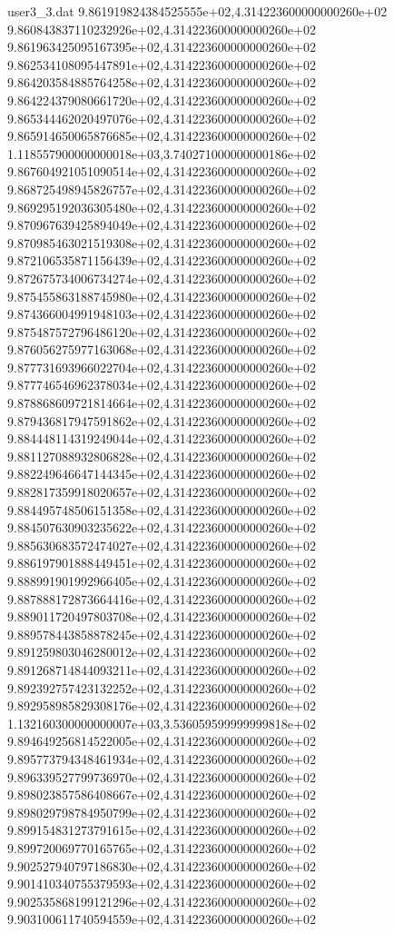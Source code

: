 \begin{filecontents}{user3_3.dat}
9.861919824384525555e+02,4.314223600000000260e+02
9.860843837110232926e+02,4.314223600000000260e+02
9.861963425095167395e+02,4.314223600000000260e+02
9.862534108095447891e+02,4.314223600000000260e+02
9.864203584885764258e+02,4.314223600000000260e+02
9.864224379080661720e+02,4.314223600000000260e+02
9.865344462020497076e+02,4.314223600000000260e+02
9.865914650065876685e+02,4.314223600000000260e+02
1.118557900000000018e+03,3.740271000000000186e+02
9.867604921051090514e+02,4.314223600000000260e+02
9.868725498945826757e+02,4.314223600000000260e+02
9.869295192036305480e+02,4.314223600000000260e+02
9.870967639425894049e+02,4.314223600000000260e+02
9.870985463021519308e+02,4.314223600000000260e+02
9.872106535871156439e+02,4.314223600000000260e+02
9.872675734006734274e+02,4.314223600000000260e+02
9.875455863188745980e+02,4.314223600000000260e+02
9.874366004991948103e+02,4.314223600000000260e+02
9.875487572796486120e+02,4.314223600000000260e+02
9.876056275977163068e+02,4.314223600000000260e+02
9.877731693966022704e+02,4.314223600000000260e+02
9.877746546962378034e+02,4.314223600000000260e+02
9.878868609721814664e+02,4.314223600000000260e+02
9.879436817947591862e+02,4.314223600000000260e+02
9.884448114319249044e+02,4.314223600000000260e+02
9.881127088932806828e+02,4.314223600000000260e+02
9.882249646647144345e+02,4.314223600000000260e+02
9.882817359918020657e+02,4.314223600000000260e+02
9.884495748506151358e+02,4.314223600000000260e+02
9.884507630903235622e+02,4.314223600000000260e+02
9.885630683572474027e+02,4.314223600000000260e+02
9.886197901888449451e+02,4.314223600000000260e+02
9.888991901992966405e+02,4.314223600000000260e+02
9.887888172873664416e+02,4.314223600000000260e+02
9.889011720497803708e+02,4.314223600000000260e+02
9.889578443858878245e+02,4.314223600000000260e+02
9.891259803046280012e+02,4.314223600000000260e+02
9.891268714844093211e+02,4.314223600000000260e+02
9.892392757423132252e+02,4.314223600000000260e+02
9.892958985829308176e+02,4.314223600000000260e+02
1.132160300000000007e+03,3.536059599999999818e+02
9.894649256814522005e+02,4.314223600000000260e+02
9.895773794348461934e+02,4.314223600000000260e+02
9.896339527799736970e+02,4.314223600000000260e+02
9.898023857586408667e+02,4.314223600000000260e+02
9.898029798784950799e+02,4.314223600000000260e+02
9.899154831273791615e+02,4.314223600000000260e+02
9.899720069770165765e+02,4.314223600000000260e+02
9.902527940797186830e+02,4.314223600000000260e+02
9.901410340755379593e+02,4.314223600000000260e+02
9.902535868199121296e+02,4.314223600000000260e+02
9.903100611740594559e+02,4.314223600000000260e+02

\end{filecontents}
